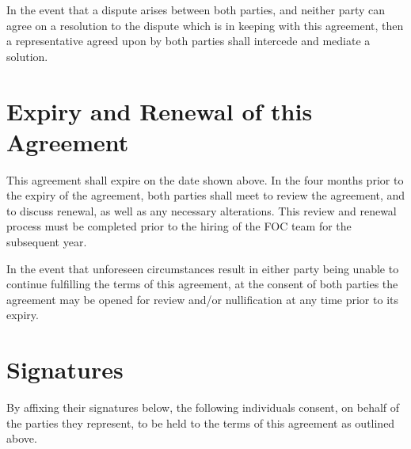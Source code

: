 \documentclass[12pt, letterpaper]{mathsoc}
\begin{document}
In the event that a dispute arises between both parties, and neither party can agree on a resolution to the dispute which is in keeping with this agreement, then a representative agreed upon by both parties shall intercede and mediate a solution.

\section{Expiry and Renewal of this Agreement}

This agreement shall expire on the date shown above. In the four months prior to the expiry of the agreement, both parties shall meet to review the agreement, and to discuss renewal, as well as any necessary alterations. This review and renewal process must be completed prior to the hiring of the FOC team for the subsequent year.

In the event that unforeseen circumstances result in either party being unable to continue fulfilling the terms of this agreement, at the consent of both parties the agreement may be opened for review and/or nullification at any time prior to its expiry.

\newpage
\section{Signatures}

By affixing their signatures below, the following individuals consent, on behalf of the parties they represent, to be held to the terms of this agreement as outlined above.




\end{document}
